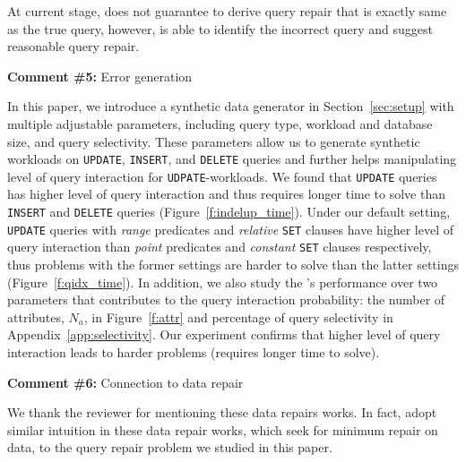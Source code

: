 At current stage, \sys does not guarantee to derive query repair that is
exactly same as the true query, however, \sys is able to identify the incorrect query
and suggest reasonable query repair. 

\comskip

\noindent
\textbf{Comment \#5:} Error generation
\begin{quote}
\end{quote}

In this paper, we introduce a synthetic data generator in Section~\ref{sec:setup}
with multiple adjustable parameters, including query type, workload and
database size, and query selectivity.  These parameters allow us to generate 
synthetic workloads on \texttt{UPDATE}, \texttt{INSERT}, and \texttt{DELETE} queries and
further helps manipulating level of query interaction for \texttt{UDPATE}-workloads. 
We found that \texttt{UPDATE} queries has higher level of query interaction and thus
requires longer time to solve than \texttt{INSERT} and \texttt{DELETE} queries 
(Figure~\ref{f:indelup_time}). Under our default setting, \texttt{UPDATE} queries with 
\textit{range} predicates and \textit{relative} \texttt{SET} clauses have higher level of query
 interaction than \textit{point} predicates and \textit{constant} 
\texttt{SET} clauses respectively, thus problems with the former settings are 
harder to solve than the latter settings (Figure~\ref{f:qidx_time}). 
In addition, we also study the \sys's performance over two parameters that 
contributes to the query interaction probability: the number of attributes, $N_a$, in 
Figure~\ref{f:attr} and percentage of query selectivity in Appendix~\ref{app:selectivity}.
Our experiment confirms that higher level of query interaction leads to 
harder problems (requires longer time to solve). 



\comskip

\noindent
\textbf{Comment \#6:} Connection to data repair
\begin{quote}
\end{quote}

We thank the reviewer for mentioning these data repairs works. In fact, 
\sys adopt similar intuition in these data repair works, 
which seek for minimum repair on data, 
to the query repair problem we studied in this paper. 

 
